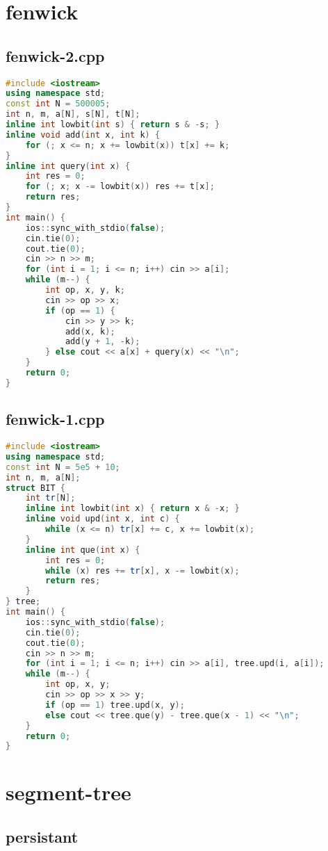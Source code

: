 \documentclass[9pt, a4paper, oneside]{book}
\begin{document}
\section{fenwick}
\subsection{fenwick-2.cpp}
\begin{lstlisting}[language={C++}]
#include <iostream>
using namespace std;
const int N = 500005;
int n, m, a[N], s[N], t[N];
inline int lowbit(int s) { return s & -s; }
inline void add(int x, int k) {
    for (; x <= n; x += lowbit(x)) t[x] += k;
}
inline int query(int x) {
    int res = 0;
    for (; x; x -= lowbit(x)) res += t[x];
    return res;
}
int main() {
    ios::sync_with_stdio(false);
    cin.tie(0);
    cout.tie(0);
    cin >> n >> m;
    for (int i = 1; i <= n; i++) cin >> a[i];
    while (m--) {
        int op, x, y, k;
        cin >> op >> x;
        if (op == 1) {
            cin >> y >> k;
            add(x, k);
            add(y + 1, -k);
        } else cout << a[x] + query(x) << "\n";
    }
    return 0;
}\end{lstlisting}
\subsection{fenwick-1.cpp}
\begin{lstlisting}[language={C++}]
#include <iostream>
using namespace std;
const int N = 5e5 + 10;
int n, m, a[N];
struct BIT {
    int tr[N];
    inline int lowbit(int x) { return x & -x; }
    inline void upd(int x, int c) {
        while (x <= n) tr[x] += c, x += lowbit(x);
    }
    inline int que(int x) {
        int res = 0;
        while (x) res += tr[x], x -= lowbit(x);
        return res;
    }
} tree;
int main() {
    ios::sync_with_stdio(false);
    cin.tie(0);
    cout.tie(0);
    cin >> n >> m;
    for (int i = 1; i <= n; i++) cin >> a[i], tree.upd(i, a[i]);
    while (m--) {
        int op, x, y;
        cin >> op >> x >> y;
        if (op == 1) tree.upd(x, y);
        else cout << tree.que(y) - tree.que(x - 1) << "\n";
    }
    return 0;
}\end{lstlisting}
\section{segment-tree}
\subsection{persistant}
\end{document}
